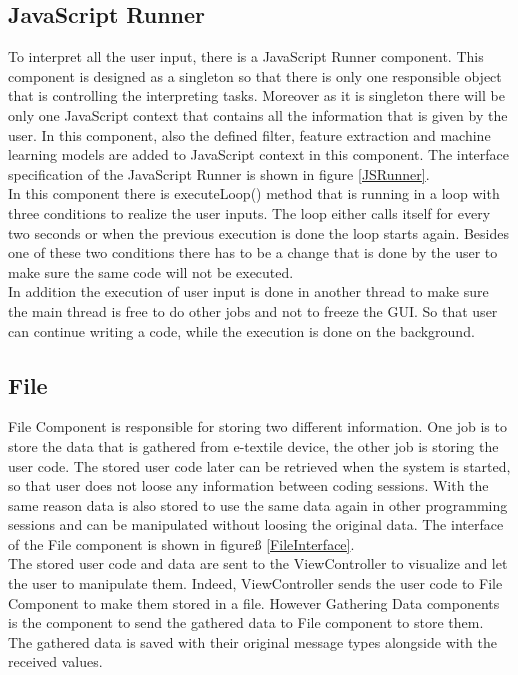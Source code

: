 \subsection{JavaScript Runner}
To interpret all the user input, there is a JavaScript Runner component. This component is designed as a singleton so that there is only one responsible object that is controlling the interpreting tasks. Moreover as it is singleton there will be only one JavaScript context that contains all the information that is given by the user. In this component, also the defined filter, feature extraction and machine learning models are added to JavaScript context in this component. The interface specification of the JavaScript Runner is shown in figure \ref{JSRunner}.\\

In this component there is executeLoop() method that is running in a loop with three conditions to realize the user inputs. The loop either calls itself for every two seconds or when the previous execution is done the loop starts again. Besides one of these two conditions there has to be a change that is done by the user to make sure the same code will not be executed. \\

In addition the execution of user input is done in another thread to make sure the main thread is free to do other jobs and not to freeze the GUI. So that user can continue writing a code, while the execution is done on the background. \\


\subsection{File}
File Component is responsible for storing two different information. One job is to store the data that is gathered from e-textile device, the other job is storing the user code. The stored user code later can be retrieved when the system is started, so that user does not loose any information between coding sessions. With the same reason data is also stored to use the same data again in other programming sessions and can be manipulated without loosing the original data. The interface of the File component is shown in figureß \ref{FileInterface}.\\

The stored user code and data are sent to the ViewController to visualize and let the user to manipulate them. Indeed, ViewController sends the user code to File Component to make them stored in a file. However Gathering Data components is the component to send the gathered data to File component to store them. The gathered data is saved with their original message types alongside with the received values. 

